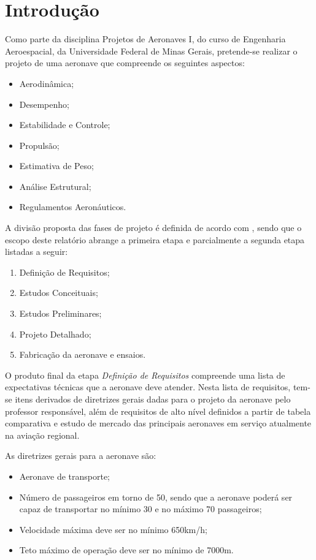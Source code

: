 \chapter*{Introdução}	%
\label{introducao}

Como parte da disciplina Projetos de Aeronaves I, do curso de Engenharia Aeroespacial, da Universidade Federal de Minas Gerais, pretende-se realizar o projeto de uma aeronave que compreende os seguintes aspectos:

\begin{itemize}
  \item Aerodinâmica;
  \item Desempenho;
  \item Estabilidade e Controle;
  \item Propulsão;
  \item Estimativa de Peso;
  \item Análise Estrutural;
  \item Regulamentos Aeronáuticos.
\end{itemize}

A divisão proposta das fases de projeto é definida de acordo com \cite{gudmundsson}, sendo que o escopo deste relatório abrange a primeira etapa e parcialmente a segunda etapa listadas a seguir:

\begin{enumerate}
  \item Definição de Requisitos;
  \item Estudos Conceituais;
  \item Estudos Preliminares;
  \item Projeto Detalhado;
  \item Fabricação da aeronave e ensaios.
\end{enumerate}

O produto final da etapa \emph{Definição de Requisitos} compreende uma lista de expectativas técnicas que a aeronave deve atender.
Nesta lista de requisitos, tem-se itens derivados de diretrizes gerais dadas para o projeto da aeronave pelo professor responsável, além de requisitos de alto nível definidos a partir de tabela comparativa e estudo de mercado das principais aeronaves em serviço atualmente na aviação regional.

As diretrizes gerais para a aeronave são:

\begin{itemize}
  \item Aeronave de transporte;
  \item Número de passageiros em torno de 50, sendo que a aeronave poderá ser capaz de transportar no mínimo 30 e no máximo 70 passageiros;
  \item Velocidade máxima deve ser no mínimo \si{650}{km/h};
  \item Teto máximo de operação deve ser no mínimo de \si{7000}{m}.
\end{itemize}

